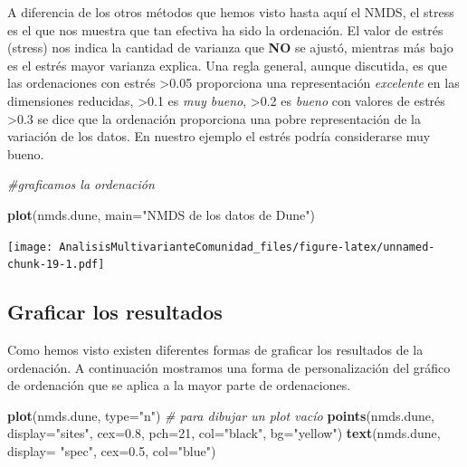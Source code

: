 \documentclass[]{book}
\newenvironment{Shaded}{\begin{snugshade}}{\end{snugshade}}
\newcommand{\KeywordTok}[1]{\textcolor[rgb]{0.13,0.29,0.53}{\textbf{{#1}}}}
\newcommand{\DataTypeTok}[1]{\textcolor[rgb]{0.13,0.29,0.53}{{#1}}}
\newcommand{\DecValTok}[1]{\textcolor[rgb]{0.00,0.00,0.81}{{#1}}}
\newcommand{\FloatTok}[1]{\textcolor[rgb]{0.00,0.00,0.81}{{#1}}}
\newcommand{\StringTok}[1]{\textcolor[rgb]{0.31,0.60,0.02}{{#1}}}
\newcommand{\CommentTok}[1]{\textcolor[rgb]{0.56,0.35,0.01}{\textit{{#1}}}}
\newcommand{\NormalTok}[1]{{#1}}
\begin{document}
A diferencia de los otros métodos que hemos visto hasta aquí el NMDS, el
stress es el que nos muestra que tan efectiva ha sido la ordenación. El
valor de estrés (stress) nos indica la cantidad de varianza que
\textbf{NO} se ajustó, mientras más bajo es el estrés mayor varianza
explica. Una regla general, aunque discutida, es que las ordenaciones
con estrés \textgreater{}0.05 proporciona una representación
\emph{excelente} en las dimensiones reducidas, \textgreater{}0.1 es
\emph{muy bueno}, \textgreater{}0.2 es \emph{bueno} con valores de
estrés \textgreater{}0.3 se dice que la ordenación proporciona una pobre
representación de la variación de los datos. En nuestro ejemplo el
estrés podría considerarse muy bueno.

\begin{Shaded}
\begin{Highlighting}[]
\CommentTok{#graficamos la ordenación}

\KeywordTok{plot}\NormalTok{(nmds.dune, }\DataTypeTok{main=}\StringTok{"NMDS de los datos de Dune"}\NormalTok{)}
\end{Highlighting}
\end{Shaded}

\texttt{[image: AnalisisMultivarianteComunidad\_files/figure-latex/unnamed-chunk-19-1.pdf]}

\subsection{Graficar los resultados}\label{graficar-los-resultados}

Como hemos visto existen diferentes formas de graficar los resultados de
la ordenación. A continuación mostramos una forma de personalización del
gráfico de ordenación que se aplica a la mayor parte de ordenaciones.

\begin{Shaded}
\begin{Highlighting}[]
\KeywordTok{plot}\NormalTok{(nmds.dune, }\DataTypeTok{type=}\StringTok{"n"}\NormalTok{)  }\CommentTok{# para dibujar un plot vacío}
\KeywordTok{points}\NormalTok{(nmds.dune, }\DataTypeTok{display=}\StringTok{"sites"}\NormalTok{, }\DataTypeTok{cex=}\FloatTok{0.8}\NormalTok{, }\DataTypeTok{pch=}\DecValTok{21}\NormalTok{, }\DataTypeTok{col=}\StringTok{"black"}\NormalTok{, }\DataTypeTok{bg=}\StringTok{"yellow"}\NormalTok{)  }
\KeywordTok{text}\NormalTok{(nmds.dune, }\DataTypeTok{display=} \StringTok{"spec"}\NormalTok{, }\DataTypeTok{cex=}\FloatTok{0.5}\NormalTok{, }\DataTypeTok{col=}\StringTok{"blue"}\NormalTok{) }
\end{Highlighting}
\end{Shaded}
\end{document}
